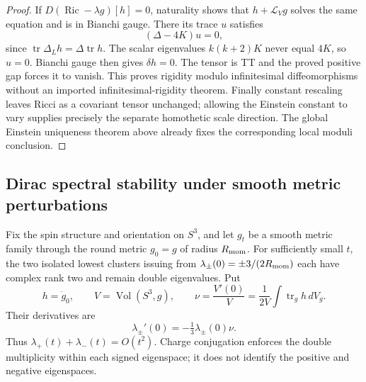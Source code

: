 \documentclass[11pt]{article}
\begin{document}
\begin{proof}
If \(D(\operatorname{Ric}-\lambda g)[h]=0\), naturality shows that
\(h+\mathcal L_Vg\) solves the same equation and is in Bianchi gauge.
There its trace \(u\) satisfies
\[
 (\Delta-4K)u=0,
\]
since \(\operatorname{tr}\Delta_Lh=\Delta\operatorname{tr}h\).
The scalar eigenvalues \(k(k+2)K\) never equal \(4K\), so \(u=0\).
Bianchi gauge then gives \(\delta h=0\).  The tensor is TT and the proved
positive gap forces it to vanish.  This proves rigidity modulo
infinitesimal diffeomorphisms without an imported infinitesimal-rigidity
theorem.  Finally constant rescaling leaves Ricci as a covariant tensor
unchanged; allowing the Einstein constant to vary supplies precisely the
separate homothetic scale direction.  The global Einstein uniqueness
theorem above already fixes the corresponding local moduli conclusion.
\end{proof}



\subsection{Dirac spectral stability under smooth metric perturbations}
\label{p1:subsec:dirac-stability}

\begin{theorem}
\label{p1:thm:lowest-dirac-pair-stability}
Fix the spin structure and orientation on \(S^3\), and let \(g_t\) be a
smooth metric family through the round metric \(g_0=g\) of radius
\(R_{\mathrm{mom}}\).  For sufficiently small \(t\), the two isolated lowest
clusters issuing from \(\lambda_\pm(0)=\pm3/(2R_{\mathrm{mom}})\) each have complex
rank two and remain double eigenvalues.  Put
\[
 h=\dot g_0,\qquad V=\operatorname{Vol}(S^3,g),\qquad
 \nu=\frac{V'(0)}V=\frac1{2V}\int\operatorname{tr}_g h\,dV_g.
\]
Their derivatives are
\[
 \boxed{\lambda_\pm'(0)=-\tfrac13\lambda_\pm(0)\nu.}
\]
Thus \(\lambda_+(t)+\lambda_-(t)=O(t^2)\).  Charge conjugation enforces
the double multiplicity within each signed eigenspace; it does not
identify the positive and negative eigenspaces.
\end{theorem}
\end{document}
